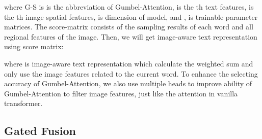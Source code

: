 \documentclass[11pt]{article}
\begin{document}
\begin{table*}[tp]

  \centering
  \begin{threeparttable}
    \end{threeparttable}
    \caption{Experimental results on the Multi30k test set. Best results are highlighted in bold.}
\end{table*}



where G-S is is the abbreviation of Gumbel-Attention,  is the  th text features,  is the  th image spatial features,  is dimension of model, and ,  is trainable parameter matrices. The score-matrix consists of the sampling results of each word and all regional features of the image. Then, we will get image-aware text representation using score matrix:


where  is  image-aware text representation which calculate the weighted sum and only use the image features related to the current word. 
To enhance the selecting accuracy of Gumbel-Attention, we also use multiple heads to improve ability of Gumbel-Attention to filter image features, just like the attention in vanilla transformer.


\subsection{Gated Fusion}
\end{document}
